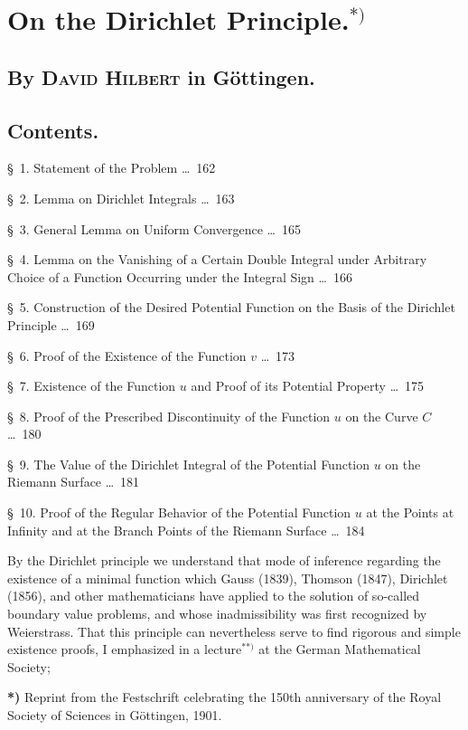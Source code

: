 \documentclass{article}
\begin{document}

\section*{On the Dirichlet Principle.${}^{*)}$}

\subsection*{By \textsc{David Hilbert} in Göttingen.}

\subsection*{Contents.}

§~1. Statement of the Problem \dots\ 162

§~2. Lemma on Dirichlet Integrals \dots\ 163

§~3. General Lemma on Uniform Convergence \dots\ 165

§~4. Lemma on the Vanishing of a Certain Double Integral under Arbitrary Choice of a Function Occurring under the Integral Sign \dots\ 166

§~5. Construction of the Desired Potential Function on the Basis of the Dirichlet Principle \dots\ 169

§~6. Proof of the Existence of the Function $v$ \dots\ 173

§~7. Existence of the Function $u$ and Proof of its Potential Property \dots\ 175

§~8. Proof of the Prescribed Discontinuity of the Function $u$ on the Curve $C$ \dots\ 180

§~9. The Value of the Dirichlet Integral of the Potential Function $u$ on the Riemann Surface \dots\ 181

§~10. Proof of the Regular Behavior of the Potential Function $u$ at the Points at Infinity and at the Branch Points of the Riemann Surface \dots\ 184

By the Dirichlet principle we understand that mode of inference regarding the existence of a minimal function which Gauss (1839), Thomson (1847), Dirichlet (1856), and other mathematicians have applied to the solution of so-called boundary value problems, and whose inadmissibility was first recognized by Weierstrass. That this principle can nevertheless serve to find rigorous and simple existence proofs, I emphasized in a lecture${}^{**)}$ at the German Mathematical Society;

\textbf{*)} Reprint from the Festschrift celebrating the 150th anniversary of the Royal Society of Sciences in Göttingen, 1901.
\end{document}
